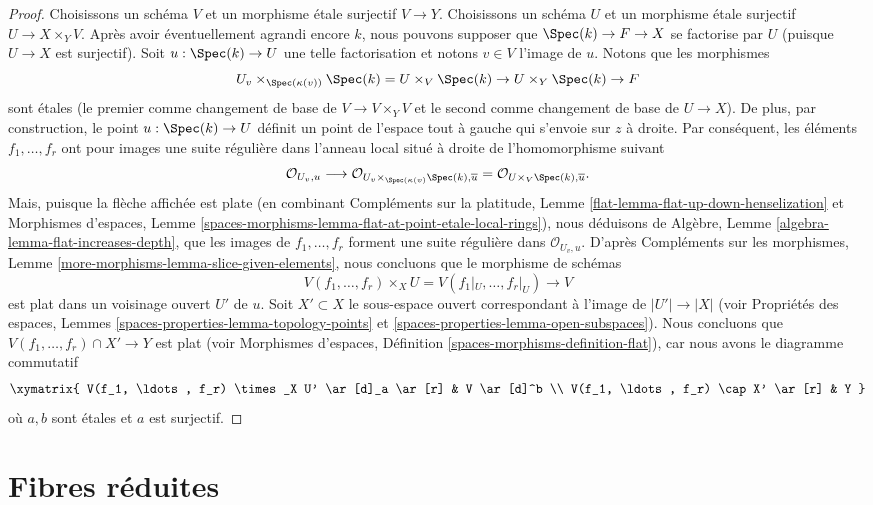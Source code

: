\begin{proof}
\medskip\noindent
Choisissons un schéma $V$ et un morphisme étale surjectif
$V \to Y$. Choisissons un schéma $U$ et un morphisme étale surjectif
$U \to X \times_Y V$. Après avoir éventuellement agrandi encore $k$, nous pouvons
supposer que $\Spec(k) \to F \to X$ se factorise par $U$ (puisque
$U \to X$ est surjectif). Soit
$u : \Spec(k) \to U$ une telle factorisation et notons $v \in V$
l'image de $u$. Notons que les morphismes
$$
U_v \times_{\Spec(\kappa(v))} \Spec(k) =
U \times_V \Spec(k) \to U \times_Y \Spec(k) \to F
$$
sont étales (le premier comme changement de base de $V \to V \times_Y V$ et
le second comme changement de base de $U \to X$). De plus, par construction,
le point $u : \Spec(k) \to U$ définit un point de l'espace tout à gauche
qui s'envoie sur $z$ à droite. Par conséquent, les éléments
$f_1, \ldots, f_r$ ont pour images une suite régulière dans l'anneau local
situé à droite de l'homomorphisme suivant
$$
\mathcal{O}_{U_v, u}
\longrightarrow
\mathcal{O}_{U_v \times_{\Spec(\kappa(v)} \Spec(k), \overline{u}}
=
\mathcal{O}_{U \times_V \Spec(k), \overline{u}}.
$$
Mais, puisque la flèche affichée est plate (en combinant
Compléments sur la platitude, Lemme \ref{flat-lemma-flat-up-down-henselization}
et
Morphismes d'espaces,
Lemme \ref{spaces-morphisms-lemma-flat-at-point-etale-local-rings}),
nous déduisons de
Algèbre, Lemme \ref{algebra-lemma-flat-increases-depth},
que les images de $f_1, \ldots, f_r$ forment une suite régulière dans
$\mathcal{O}_{U_v, u}$. D'après
Compléments sur les morphismes, Lemme \ref{more-morphisms-lemma-slice-given-elements},
nous concluons que le morphisme de schémas
$$
V(f_1, \ldots, f_r) \times_X U = V(f_1|_U, \ldots, f_r|_U) \to V
$$
est plat dans un voisinage ouvert $U'$ de $u$. Soit $X' \subset X$
le sous-espace ouvert correspondant à l'image de
$|U'| \to |X|$ (voir
Propriétés des espaces, Lemmes
\ref{spaces-properties-lemma-topology-points} et
\ref{spaces-properties-lemma-open-subspaces}).
Nous concluons que $V(f_1, \ldots, f_r) \cap X' \to Y$ est plat
(voir
Morphismes d'espaces, Définition \ref{spaces-morphisms-definition-flat}),
car
nous avons le diagramme commutatif
$$
\xymatrix{
V(f_1, \ldots, f_r) \times_X U' \ar[d]_a \ar[r] & V \ar[d]^b \\
V(f_1, \ldots, f_r) \cap X' \ar[r] & Y
}
$$
où $a, b$ sont étales et $a$ est surjectif.
\end{proof}






\section{Fibres réduites}
\label{section-reduced}

